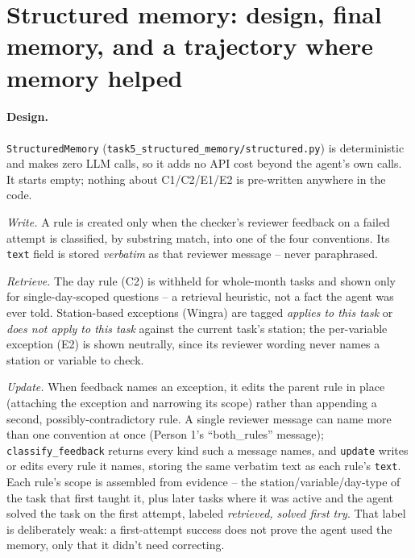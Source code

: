 %

\section{Structured memory: design, final memory, and a trajectory where memory helped}

\paragraph{Design.} \texttt{StructuredMemory} (\texttt{task5\_structured\_memory/structured.py})
is deterministic and makes zero LLM calls, so it adds no API cost beyond the agent's own
calls. It starts empty; nothing about C1/C2/E1/E2 is pre-written anywhere in the code.

\emph{Write.} A rule is created only when the checker's reviewer feedback on a failed
attempt is classified, by substring match, into one of the four conventions. Its
\texttt{text} field is stored \emph{verbatim} as that reviewer message -- never paraphrased.

\emph{Retrieve.} The day rule (C2) is withheld for whole-month tasks and shown only for
single-day-scoped questions -- a retrieval heuristic, not a fact the agent was ever told.
Station-based exceptions (Wingra) are tagged \emph{applies to this task} or \emph{does not
apply to this task} against the current task's station; the per-variable exception (E2) is
shown neutrally, since its reviewer wording never names a station or variable to check.

\emph{Update.} When feedback names an exception, it edits the parent rule in place (attaching
the exception and narrowing its scope) rather than appending a second, possibly-contradictory
rule. A single reviewer message can name more than one convention at once (Person 1's
``both\_rules'' message); \texttt{classify\_feedback} returns every kind such a message
names, and \texttt{update} writes or edits every rule it names, storing the same verbatim text
as each rule's \texttt{text}. Each rule's scope is assembled from evidence -- the
station/variable/day-type of the task that first taught it, plus later tasks where it was
active and the agent solved the task on the first attempt, labeled \emph{retrieved, solved
first try}. That label is deliberately weak: a first-attempt success does not prove the agent
used the memory, only that it didn't need correcting.

